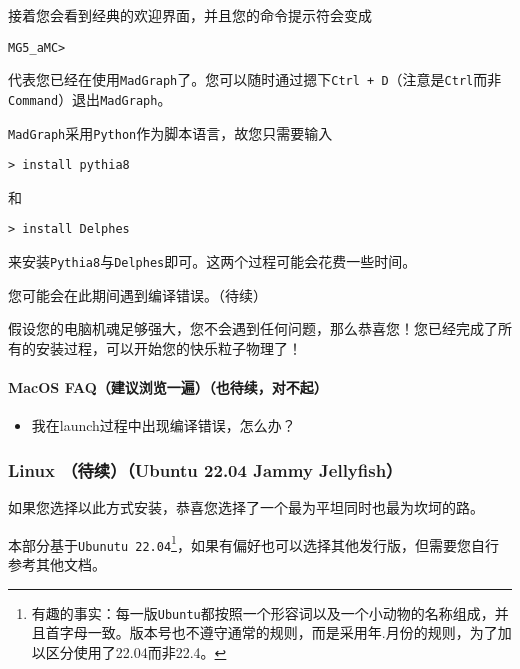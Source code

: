 \documentclass[a4paper]{ctexart}
\begin{document}
接着您会看到经典的欢迎界面，并且您的命令提示符会变成
\begin{verbatim}
MG5_aMC>
\end{verbatim}
代表您已经在使用\texttt{MadGraph}了。您可以随时通过摁下\texttt{Ctrl + D}（注意是\texttt{Ctrl}而非\texttt{Command}）退出\texttt{MadGraph}。

\texttt{MadGraph}采用\texttt{Python}作为脚本语言，故您只需要输入
\begin{verbatim}
> install pythia8
\end{verbatim}
和
\begin{verbatim}
> install Delphes
\end{verbatim}
来安装\texttt{Pythia8}与\texttt{Delphes}即可。这两个过程可能会花费一些时间。

您可能会在此期间遇到编译错误。（待续）

假设您的电脑机魂足够强大，您不会遇到任何问题，那么恭喜您！您已经完成了所有的安装过程，可以开始您的快乐粒子物理了！





\paragraph{MacOS FAQ（建议浏览一遍）（也待续，对不起）}
\begin{itemize}
    \item 我在launch过程中出现编译错误，怎么办？
\end{itemize}








































\subsubsection{Linux \label{linux}（待续）（Ubuntu 22.04 Jammy Jellyfish）}

如果您选择以此方式安装，恭喜您选择了一个最为平坦同时也最为坎坷的路。

本部分基于\texttt{Ubunutu 22.04}\footnote{有趣的事实：每一版\texttt{Ubuntu}都按照一个形容词以及一个小动物的名称组成，并且首字母一致。版本号也不遵守通常的规则，而是采用年.月份的规则，为了加以区分使用了22.04而非22.4。}，如果有偏好也可以选择其他发行版，但需要您自行参考其他文档。
\end{document}
